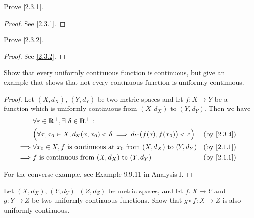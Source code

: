 \exercisesection

\begin{exercise}\label{ex 2.3.1}
  Prove \cref{2.3.1}.
\end{exercise}

\begin{proof}
  See \cref{2.3.1}.
\end{proof}

\begin{exercise}\label{ex 2.3.2}
  Prove \cref{2.3.2}.
\end{exercise}

\begin{proof}
  See \cref{2.3.2}.
\end{proof}

\begin{exercise}\label{ex 2.3.3}
  Show that every uniformly continuous function is continuous, but give an example that shows that not every continuous function is uniformly continuous.
\end{exercise}

\begin{proof}
  Let \((X, d_X)\), \((Y, d_Y)\) be two metric spaces and let \(f : X \to Y\) be a function which is uniformly continuous from \((X, d_X)\) to \((Y, d_Y)\).
  Then we have
  \begin{align*}
             & \forall \varepsilon \in \R^+, \exists\ \delta \in \R^+ :                                                                         \\
             & \Big(\forall x, x_0 \in X, d_X(x, x_0) < \delta \implies d_Y\big(f(x), f(x_0)\big) < \varepsilon\Big) & \text{(by \cref{2.3.4})} \\
    \implies & \forall x_0 \in X, f \text{ is continuous at } x_0 \text{ from } (X, d_X) \text{ to } (Y, d_Y)        & \text{(by \cref{2.1.1})} \\
    \implies & f \text{ is continuous from } (X, d_X) \text{ to } (Y, d_Y).                                          & \text{(by \cref{2.1.1})}
  \end{align*}

  For the converse example, see Example 9.9.11 in Analysis I.
\end{proof}

\begin{exercise}\label{ex 2.3.4}
  Let \((X, d_X)\), \((Y, d_Y)\), \((Z, d_Z)\) be metric spaces, and let \(f : X \to Y\) and \(g : Y \to Z\) be two uniformly continuous functions.
  Show that \(g \circ f : X \to Z\) is also uniformly continuous.
\end{exercise}

